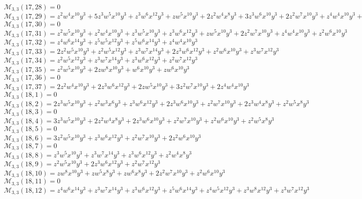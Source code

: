 \documentclass[12pt]{memoireuqam1.3}
\begin{document}
$\mathcal{M}_{3,3}(17,28)=0$\\
$\mathcal{M}_{3,3}(17,29)=z^2w^4x^{10}y^3+5z^3w^5x^{10}y^3+z^3w^6x^{12}y^3+zw^5x^{10}y^3+2z^2w^4x^8y^3+3z^3w^6x^{10}y^3+2z^2w^7x^{10}y^3+z^4w^4x^{10}y^3+z^2w^5x^8y^3$\\
$\mathcal{M}_{3,3}(17,30)=0$\\
$\mathcal{M}_{3,3}(17,31)=z^2w^5x^{10}y^3+z^2w^4x^{10}y^3+z^3w^5x^{10}y^3+z^3w^6x^{12}y^3+zw^5x^{10}y^3+2z^2w^7x^{10}y^3+z^4w^4x^{10}y^3+z^2w^6x^{10}y^3$\\
$\mathcal{M}_{3,3}(17,32)=z^4w^6x^{14}y^3+z^5w^5x^{12}y^3+z^5w^6x^{14}y^3+z^4w^4x^{10}y^3$\\
$\mathcal{M}_{3,3}(17,33)=2z^2w^5x^{10}y^3+z^2w^5x^{12}y^3+z^3w^7x^{14}y^3+2z^3w^6x^{12}y^3+z^2w^6x^{10}y^3+z^3w^7x^{12}y^3$\\
$\mathcal{M}_{3,3}(17,34)=z^2w^5x^{12}y^3+z^3w^7x^{14}y^3+z^3w^6x^{12}y^3+z^2w^7x^{12}y^3$\\
$\mathcal{M}_{3,3}(17,35)=z^2w^5x^{10}y^3+2zw^8x^{10}y^3+w^6x^{10}y^3+zw^6x^{10}y^3$\\
$\mathcal{M}_{3,3}(17,36)=0$\\
$\mathcal{M}_{3,3}(17,37)=2z^2w^4x^{10}y^3+2z^3w^6x^{12}y^3+2zw^5x^{10}y^3+3z^2w^7x^{10}y^3+2z^4w^4x^{10}y^3$\\
$\mathcal{M}_{3,3}(18,1)=0$\\
$\mathcal{M}_{3,3}(18,2)=2z^3w^5x^{10}y^3+z^2w^3x^6y^3+z^3w^6x^{12}y^3+2z^3w^6x^{10}y^3+z^2w^7x^{10}y^3+2z^3w^4x^8y^3+z^2w^5x^8y^3$\\
$\mathcal{M}_{3,3}(18,3)=0$\\
$\mathcal{M}_{3,3}(18,4)=3z^3w^5x^{10}y^3+2z^2w^4x^8y^3+2z^3w^6x^{10}y^3+z^2w^7x^{10}y^3+z^2w^6x^{10}y^3+z^2w^5x^8y^3$\\
$\mathcal{M}_{3,3}(18,5)=0$\\
$\mathcal{M}_{3,3}(18,6)=3z^2w^5x^{10}y^3+z^3w^6x^{12}y^3+z^2w^7x^{10}y^3+2z^2w^6x^{10}y^3$\\
$\mathcal{M}_{3,3}(18,7)=0$\\
$\mathcal{M}_{3,3}(18,8)=z^3w^5x^{10}y^3+z^3w^7x^{14}y^3+z^3w^6x^{12}y^3+z^2w^4x^8y^3$\\
$\mathcal{M}_{3,3}(18,9)=z^2w^5x^{10}y^3+2z^3w^6x^{12}y^3+z^2w^7x^{12}y^3$\\
$\mathcal{M}_{3,3}(18,10)=zw^8x^{10}y^3+zw^5x^8y^3+zw^6x^8y^3+2z^2w^7x^{10}y^3+z^2w^6x^{10}y^3$\\
$\mathcal{M}_{3,3}(18,11)=0$\\
$\mathcal{M}_{3,3}(18,12)=z^4w^6x^{14}y^3+z^3w^7x^{14}y^3+z^3w^6x^{12}y^3+z^5w^6x^{14}y^3+z^4w^5x^{12}y^3+z^3w^8x^{12}y^3+z^3w^7x^{12}y^3$\\
\end{document}
